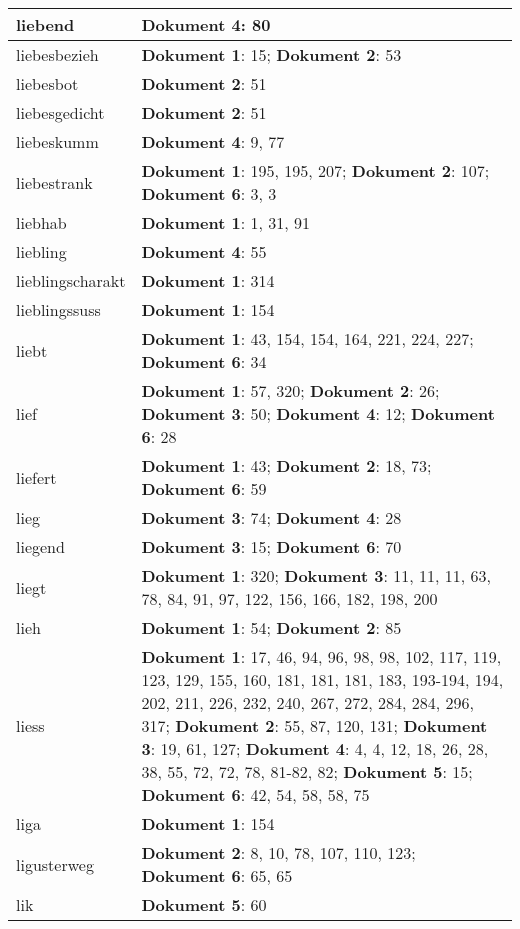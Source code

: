 \documentclass[a5paper]{article}
\begin{document}
\begin{longtable}[l]{|l|p{3in}|}
\hline
liebend & \textbf{Dokument 4}: 80 \\
\hline
liebesbezieh & \textbf{Dokument 1}: 15; \textbf{Dokument 2}: 53 \\
\hline
liebesbot & \textbf{Dokument 2}: 51 \\
\hline
liebesgedicht & \textbf{Dokument 2}: 51 \\
\hline
liebeskumm & \textbf{Dokument 4}: 9, 77 \\
\hline
liebestrank & \textbf{Dokument 1}: 195, 195, 207; \textbf{Dokument 2}: 107; \textbf{Dokument 6}: 3, 3 \\
\hline
liebhab & \textbf{Dokument 1}: 1, 31, 91 \\
\hline
liebling & \textbf{Dokument 4}: 55 \\
\hline
lieblingscharakt & \textbf{Dokument 1}: 314 \\
\hline
lieblingssuss & \textbf{Dokument 1}: 154 \\
\hline
liebt & \textbf{Dokument 1}: 43, 154, 154, 164, 221, 224, 227; \textbf{Dokument 6}: 34 \\
\hline
lief & \textbf{Dokument 1}: 57, 320; \textbf{Dokument 2}: 26; \textbf{Dokument 3}: 50; \textbf{Dokument 4}: 12; \textbf{Dokument 6}: 28 \\
\hline
liefert & \textbf{Dokument 1}: 43; \textbf{Dokument 2}: 18, 73; \textbf{Dokument 6}: 59 \\
\hline
lieg & \textbf{Dokument 3}: 74; \textbf{Dokument 4}: 28 \\
\hline
liegend & \textbf{Dokument 3}: 15; \textbf{Dokument 6}: 70 \\
\hline
liegt & \textbf{Dokument 1}: 320; \textbf{Dokument 3}: 11, 11, 11, 63, 78, 84, 91, 97, 122, 156, 166, 182, 198, 200 \\
\hline
lieh & \textbf{Dokument 1}: 54; \textbf{Dokument 2}: 85 \\
\hline
liess & \textbf{Dokument 1}: 17, 46, 94, 96, 98, 98, 102, 117, 119, 123, 129, 155, 160, 181, 181, 181, 183, 193-194, 194, 202, 211, 226, 232, 240, 267, 272, 284, 284, 296, 317; \textbf{Dokument 2}: 55, 87, 120, 131; \textbf{Dokument 3}: 19, 61, 127; \textbf{Dokument 4}: 4, 4, 12, 18, 26, 28, 38, 55, 72, 72, 78, 81-82, 82; \textbf{Dokument 5}: 15; \textbf{Dokument 6}: 42, 54, 58, 58, 75 \\
\hline
liga & \textbf{Dokument 1}: 154 \\
\hline
ligusterweg & \textbf{Dokument 2}: 8, 10, 78, 107, 110, 123; \textbf{Dokument 6}: 65, 65 \\
\hline
lik & \textbf{Dokument 5}: 60 \\

\end{longtable}
\end{document}
